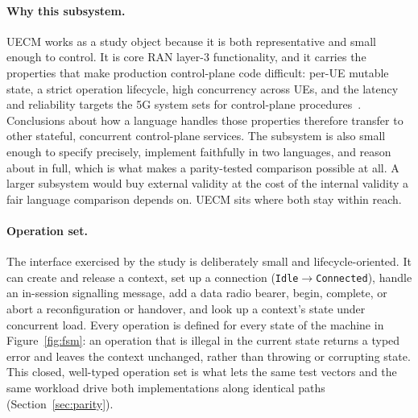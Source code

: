 \documentclass[english,oneside,a4paper,censored,csm,software-track-2020]{HYthesisML}
\begin{document}
\paragraph{Why this subsystem.}
UECM works as a study object because it is both representative and small enough to control. It
is core RAN layer-3 functionality, and it carries the properties that make production
control-plane code difficult: per-UE mutable state, a strict operation lifecycle, high
concurrency across UEs, and the latency and reliability targets the 5G system sets for
control-plane procedures~\cite{3gpp38913,3gpp22261}. Conclusions about how a language handles
those properties therefore transfer to other stateful, concurrent control-plane services. The
subsystem is also small enough to specify precisely, implement faithfully in two languages, and
reason about in full, which is what makes a parity-tested comparison possible at all. A larger
subsystem would buy external validity at the cost of the internal validity a fair language
comparison depends on. UECM sits where both stay within reach.

\paragraph{Operation set.}
The interface exercised by the study is deliberately small and lifecycle-oriented. It can create
and release a context, set up a connection (\texttt{Idle}$\rightarrow$\texttt{Connected}), handle
an in-session signalling message, add a data radio bearer, begin, complete, or abort a
reconfiguration or handover, and look up a context's state under concurrent load. Every operation is
defined for every state of the machine in Figure~\ref{fig:fsm}: an operation that is illegal in
the current state returns a typed error and leaves the context unchanged, rather than throwing
or corrupting state. This closed, well-typed operation set is what lets the same test vectors
and the same workload drive both implementations along identical paths
(Section~\ref{sec:parity}).
\end{document}
